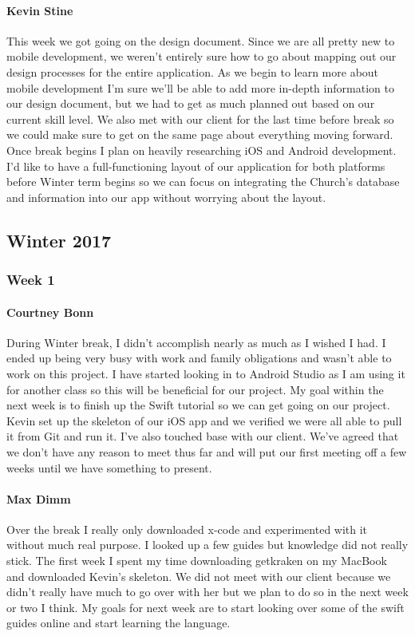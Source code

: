 			\paragraph{Kevin Stine}
			This week we got going on the design document. Since we are all pretty new to mobile development, we weren't entirely sure how to go about mapping out our design processes for the entire application. As we begin to learn more about mobile development I'm sure we'll be able to add more in-depth information to our design document, but we had to get as much planned out based on our current skill level. We also met with our client for the last time before break so we could make sure to get on the same page about everything moving forward. Once break begins I plan on heavily researching iOS and Android development. I'd like to have a full-functioning layout of our application for both platforms before Winter term begins so we can focus on integrating the Church's database and information into our app without worrying about the layout.
		
	\subsection{Winter 2017}
	
		\subsubsection{Week 1}
		
			\paragraph{Courtney Bonn}
			During Winter break, I didn't accomplish nearly as much as I wished I had. I ended up being very busy with work and family obligations and wasn't able to work on this project. I have started looking in to Android Studio as I am using it for another class so this will be beneficial for our project. My goal within the next week is to finish up the Swift tutorial so we can get going on our project. Kevin set up the skeleton of our iOS app and we verified we were all able to pull it from Git and run it. I've also touched base with our client. We've agreed that we don't have any reason to meet thus far and will put our first meeting off a few weeks until we have something to present.

			\paragraph{Max Dimm}
			Over the break I really only downloaded x-code and experimented with it without much real purpose. I looked up a few guides but knowledge did not really stick. The first week I spent my time downloading getkraken on my MacBook and downloaded Kevin's skeleton. We did not meet with our client because we didn't really have much to go over with her but we plan to do so in the next week or two I think. My goals for next week are to start looking over some of the swift guides online and start learning the language.
			
